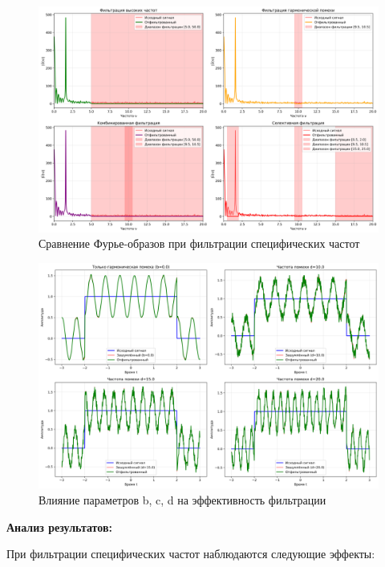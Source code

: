\begin{figure}[H]
\centering
\includegraphics[width=\textwidth]{images/task1/specific_freq_filter_freq_domain.png}
\caption{Сравнение Фурье-образов при фильтрации специфических частот}
\end{figure}

\begin{figure}[H]
\centering
\includegraphics[width=\textwidth]{images/task1/specific_freq_filter_parameters.png}
\caption{Влияние параметров b, c, d на эффективность фильтрации}
\end{figure}

\textbf{Анализ результатов:}

При фильтрации специфических частот наблюдаются следующие эффекты:

